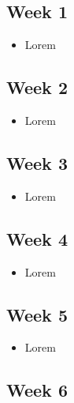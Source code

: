 \documentclass[10pt, onecolumn, draftclsnofoot, letterpaper, compsoc]{IEEEtran}
\begin{document}
\subsection{Week 1}

    \begin{itemize}

	\item Lorem

    \end{itemize}

\subsection{Week 2}

    \begin{itemize}

	\item Lorem

    \end{itemize}

\subsection{Week 3}

    \begin{itemize}

	\item Lorem

    \end{itemize}

\subsection{Week 4}

    \begin{itemize}

	\item Lorem

    \end{itemize}

\subsection{Week 5}

    \begin{itemize}

	\item Lorem

    \end{itemize}

\subsection{Week 6}
\end{document}
